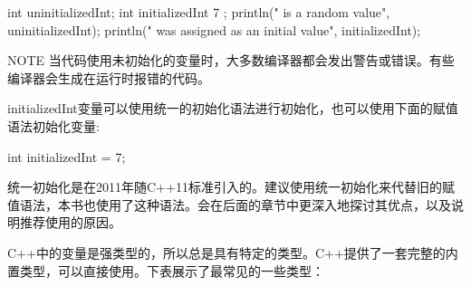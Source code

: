 \begin{cpp}
int uninitializedInt;
int initializedInt { 7 };
println("{} is a random value", uninitializedInt);
println("{} was assigned as an initial value", initializedInt);
\end{cpp}

\begin{myNotic}{NOTE}
当代码使用未初始化的变量时，大多数编译器都会发出警告或错误。有些编译器会生成在运行时报错的代码。
\end{myNotic}

initializedInt变量可以使用统一的初始化语法进行初始化，也可以使用下面的赋值语法初始化变量:

\begin{cpp}
int initializedInt = 7;
\end{cpp}

统一初始化是在2011年随C++11标准引入的。建议使用统一初始化来代替旧的赋值语法，本书也使用了这种语法。会在后面的章节中更深入地探讨其优点，以及说明推荐使用的原因。

C++中的变量是强类型的，所以总是具有特定的类型。C++提供了一套完整的内置类型，可以直接使用。下表展示了最常见的一些类型：

